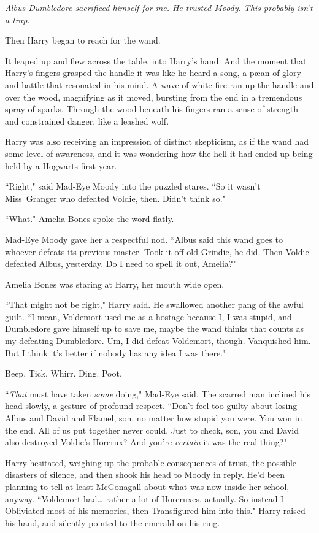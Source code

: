 \emph{Albus Dumbledore sacrificed himself for me. He trusted Moody. This probably isn't a trap.}

Then Harry began to reach for the wand.

It leaped up and flew across the table, into Harry's hand. And the moment that Harry's fingers grasped the handle it was like he heard a song, a pæan of glory and battle that resonated in his mind. A wave of white fire ran up the handle and over the wood, magnifying as it moved, bursting from the end in a tremendous spray of sparks. Through the wood beneath his fingers ran a sense of strength and constrained danger, like a leashed wolf.

Harry was also receiving an impression of distinct skepticism, as if the wand had some level of awareness, and it was wondering how the hell it had ended up being held by a Hogwarts first-year.

``Right," said Mad-Eye Moody into the puzzled stares. ``So it wasn't Miss~Granger who defeated Voldie, then. Didn't think so."

``What." Amelia Bones spoke the word flatly.

Mad-Eye Moody gave her a respectful nod. ``Albus said this wand goes to whoever defeats its previous master. Took it off old Grindie, he did. Then Voldie defeated Albus, yesterday. Do I need to spell it out, Amelia?"

Amelia Bones was staring at Harry, her mouth wide open.

``That might not be right," Harry said. He swallowed another pang of the awful guilt. ``I mean, Voldemort used me as a hostage because I, I was stupid, and Dumbledore gave himself up to save me, maybe the wand thinks that counts as my defeating Dumbledore. Um, I did defeat Voldemort, though. Vanquished him. But I think it's better if nobody has any idea I was there."

Beep. Tick. Whirr. Ding. Poot.

``\emph{That} must have taken \emph{some} doing," Mad-Eye said. The scarred man inclined his head slowly, a gesture of profound respect. ``Don't feel too guilty about losing Albus and David and Flamel, son, no matter how stupid you were. You won in the end. All of us put together never could. Just to check, son, you and David also destroyed Voldie's Horcrux? And you're \emph{certain} it was the real thing?"

Harry hesitated, weighing up the probable consequences of trust, the possible disasters of silence, and then shook his head to Moody in reply. He'd been planning to tell at least McGonagall about what was now inside her school, anyway. ``Voldemort had{\ldots} rather a lot of Horcruxes, actually. So instead I Obliviated most of his memories, then Transfigured him into this." Harry raised his hand, and silently pointed to the emerald on his ring.

